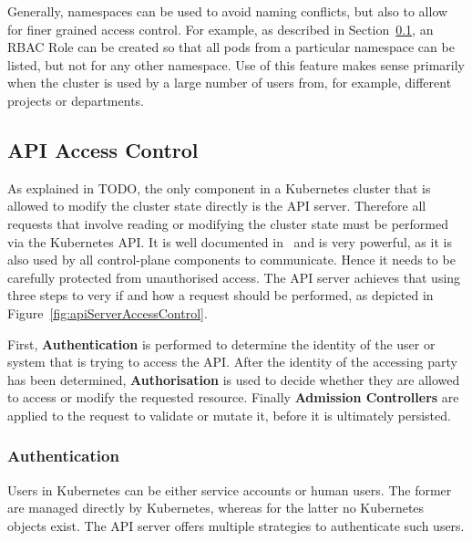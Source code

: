 Generally, namespaces can be used to avoid naming conflicts, but also to allow for finer grained access control. For example, as described in Section~\ref{sec:apiAccessControl}, an RBAC Role can be created so that all pods from a particular namespace can be listed, but not for any other namespace. Use of this feature makes sense primarily when the cluster is used by a large number of users from, for example, different projects or departments.


\subsection{API Access Control} \label{sec:apiAccessControl}

As explained in TODO, the only component in a Kubernetes cluster that is allowed to modify the cluster state directly is the API server. Therefore all requests that involve reading or modifying the cluster state must be performed via the Kubernetes API. It is well documented in~\textcite{k8sdocsApi} and is very powerful, as it is also used by all control-plane components to communicate. Hence it needs to be carefully protected from unauthorised access. The API server achieves that using three steps to very if and how a request should be performed, as depicted in Figure~\ref{fig:apiServerAccessControl}.


First, \textbf{Authentication} is performed to determine the identity of the user or system that is trying to access the API. After the identity of the accessing party has been determined, \textbf{Authorisation} is used to decide whether they are allowed to access or modify the requested resource. Finally \textbf{Admission Controllers} are applied to the request to validate or mutate it, before it is ultimately persisted.

\subsubsection{Authentication} \label{authentication}

Users in Kubernetes can be either service accounts or human users. The former are managed directly by Kubernetes, whereas for the latter no Kubernetes objects exist. The API server offers multiple strategies to authenticate such users. 

